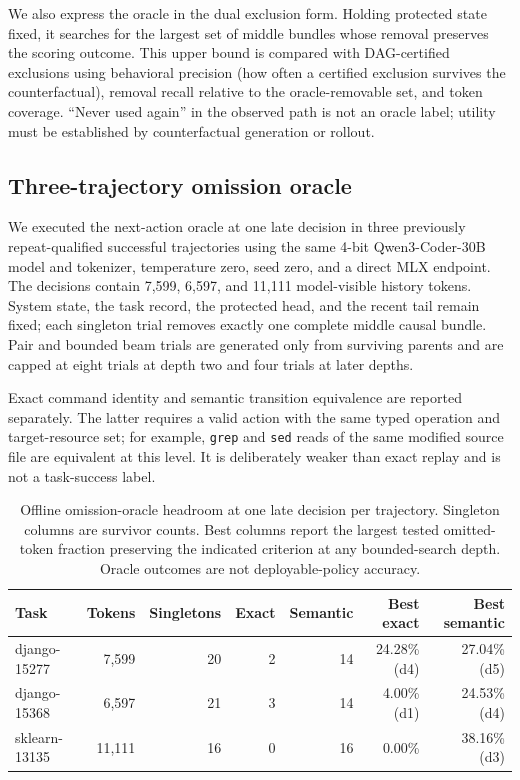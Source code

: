\documentclass[11pt]{article}
\begin{document}
We also express the oracle in the dual exclusion form. Holding protected state
fixed, it searches for the largest set of middle bundles whose removal preserves
the scoring outcome. This upper bound is compared with DAG-certified exclusions
using behavioral precision (how often a certified exclusion survives the
counterfactual), removal recall relative to the oracle-removable set, and token
coverage. ``Never used again'' in the observed path is not an oracle label;
utility must be established by counterfactual generation or rollout.

\subsection{Three-trajectory omission oracle}

We executed the next-action oracle at one late decision in three previously
repeat-qualified successful trajectories using the same 4-bit
Qwen3-Coder-30B model and tokenizer, temperature zero, seed zero, and a direct
MLX endpoint.  The decisions contain 7,599, 6,597, and 11,111 model-visible
history tokens.  System state, the task record, the protected head, and the
recent tail remain fixed; each singleton trial removes exactly one complete
middle causal bundle.  Pair and bounded beam trials are generated only from
surviving parents and are capped at eight trials at depth two and four trials
at later depths.

Exact command identity and semantic transition equivalence are reported
separately.  The latter requires a valid action with the same typed operation
and target-resource set; for example, \texttt{grep} and \texttt{sed} reads of
the same modified source file are equivalent at this level.  It is deliberately
weaker than exact replay and is not a task-success label.

\begin{table}[H]
\centering
\scriptsize
\caption{Offline omission-oracle headroom at one late decision per trajectory.
Singleton columns are survivor counts. Best columns report the largest tested
omitted-token fraction preserving the indicated criterion at any bounded-search
depth. Oracle outcomes are not deployable-policy accuracy.}
\label{tab:oracle-headroom-three}
\begin{tabular}{lrrrrrr}
\toprule
Task & Tokens & Singletons & Exact & Semantic & Best exact & Best semantic \\
\midrule
django-15277 & 7,599 & 20 & 2 & 14 & 24.28\% (d4) & 27.04\% (d5) \\
django-15368 & 6,597 & 21 & 3 & 14 & 4.00\% (d1) & 24.53\% (d4) \\
sklearn-13135 & 11,111 & 16 & 0 & 16 & 0.00\% & 38.16\% (d3) \\
\bottomrule
\end{tabular}
\end{table}
\end{document}
